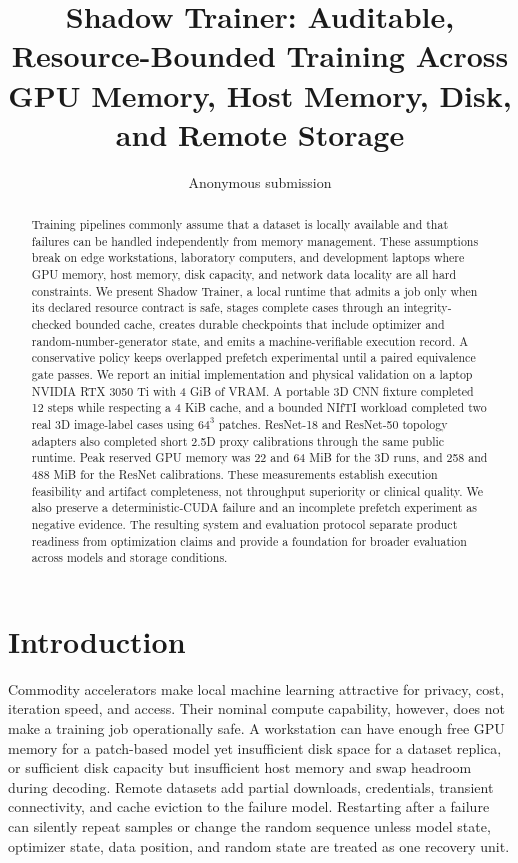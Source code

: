 \documentclass[10pt,twocolumn]{article}
\title{Shadow Trainer: Auditable, Resource-Bounded Training Across GPU Memory, Host Memory, Disk, and Remote Storage}
\author{Anonymous submission}
\date{}
\begin{document}
\maketitle

\begin{abstract}
Training pipelines commonly assume that a dataset is locally available and
that failures can be handled independently from memory management. These
assumptions break on edge workstations, laboratory computers, and development
laptops where GPU memory, host memory, disk capacity, and network data locality
are all hard constraints. We present Shadow Trainer, a local runtime that
admits a job only when its declared resource contract is safe, stages complete
cases through an integrity-checked bounded cache, creates durable checkpoints
that include optimizer and random-number-generator state, and emits a
machine-verifiable execution record. A conservative policy keeps overlapped
prefetch experimental until a paired equivalence gate passes. We report an
initial implementation and physical validation on a laptop NVIDIA RTX 3050 Ti
with 4 GiB of VRAM. A portable 3D CNN fixture completed 12 steps while respecting
a 4 KiB cache, and a bounded NIfTI workload completed two real 3D image-label
cases using $64^3$ patches. ResNet-18 and ResNet-50 topology adapters also
completed short 2.5D proxy calibrations through the same public runtime. Peak reserved GPU memory was 22 and 64 MiB for the 3D runs, and 258 and 488 MiB for the ResNet calibrations. These measurements establish execution
feasibility and artifact completeness, not throughput superiority or clinical
quality. We also preserve a deterministic-CUDA failure and an incomplete
prefetch experiment as negative evidence. The resulting system and evaluation
protocol separate product readiness from optimization claims and provide a
foundation for broader evaluation across models and storage conditions.
\end{abstract}

\section{Introduction}

Commodity accelerators make local machine learning attractive for privacy,
cost, iteration speed, and access. Their nominal compute capability, however,
does not make a training job operationally safe. A workstation can have enough
free GPU memory for a patch-based model yet insufficient disk space for a
dataset replica, or sufficient disk capacity but insufficient host memory and
swap headroom during decoding. Remote datasets add partial downloads,
credentials, transient connectivity, and cache eviction to the failure model.
Restarting after a failure can silently repeat samples or change the random
sequence unless model state, optimizer state, data position, and random state
are treated as one recovery unit.
\end{document}
